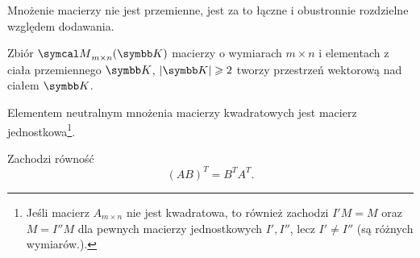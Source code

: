 \begin{remark}
    Mnożenie macierzy nie jest przemienne, jest za to łączne i obustronnie rozdzielne względem dodawania.
\end{remark}

\begin{fact}
    Zbiór $\sM_{m \times n}(\KK)$ macierzy o wymiarach $m \times n$ i elementach z ciała przemiennego $\KK$, $|\KK| \geq 2$ tworzy przestrzeń wektorową nad ciałem $\KK$.
\end{fact}

\begin{fact}
    Elementem neutralnym mnożenia macierzy kwadratowych jest macierz jednostkowa\footnote{Jeśli macierz $A_{m\times n}$ nie jest kwadratowa, to również zachodzi $I'M = M$ oraz $M = I''M$ dla pewnych macierzy jednostkowych $I', I''$, lecz $I' \neq I''$ (są różnych wymiarów.).}.
\end{fact}

\begin{fact}
    \label{f:AB^T = B^T A^T}
    Zachodzi równość
    \[ (AB)^T = B^T A^T. \]
\end{fact}